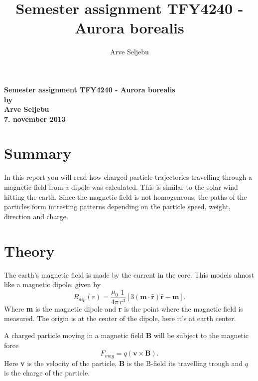 \documentclass[11pt,a4paper]{article}
\begin{document}
\title{Semester assignment TFY4240 - Aurora borealis}
\author{Arve Seljebu}
\thispagestyle{empty}
\begin{center}
\vspace{5mm}
\LARGE
\textbf{Semester assignment TFY4240 - Aurora borealis} \\
\Large
\vspace{5mm}
\textbf{by} \\
\vspace{5mm}
\large
\textbf{Arve Seljebu} \\
\vspace{5mm}
\textbf{7. november 2013} \\
\vspace{20mm}
\end{center}
\newpage
\tableofcontents
\thispagestyle{empty}
\setcounter{tocdepth}{2}
\newpage

\section{Summary}
In this report you will read how charged particle trajectories travelling through a magnetic field from a dipole was calculated. This is similar to the solar wind hitting the earth. Since the magnetic field is not homogeneous, the paths of the particles form intresting patterns depending on the particle speed, weight, direction and charge.

\section{Theory}
The earth's magnetic field is made by the current in the core. This models almost like a magnetic dipole, given by
\begin{equation}
\label{equation.Bdip}
B_{dip}(r) = \frac{\mu_0}{4\pi} \frac{1}{r^3}[3(\textbf{m} \cdot \hat{\textbf{r} } ) \hat{\textbf{r}} -\textbf{m}].
\end{equation}
Where \textbf{m} is the magnetic dipole and \textbf{r} is the point where the magnetic field is measured. The origin is at the center of the dipole, here it's at earth center.

A charged particle moving in a magnetic field \textbf{B} will be subject to the magnetic force
\begin{equation}
\label{equation.forceMag}
F_{mag} = q(\textbf{v} \times \textbf{B}).
\end{equation}
Here \textbf{v} is the velocity of the particle, \textbf{B} is the B-field its travelling trough and $q$ is the charge of the particle.
\end{document}
